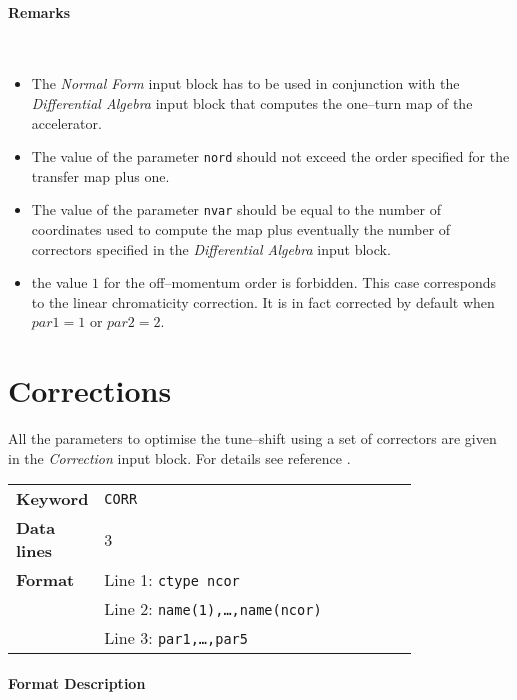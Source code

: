 \paragraph{Remarks}~
\begin{itemize}
    \item The \textit{Normal Form} input block has to be used in conjunction with the \textit{Differential Algebra} input block that computes the one--turn map of the accelerator.
    \item The value of the parameter \texttt{nord} should not exceed the order specified for the transfer map plus one.
    \item The value of the parameter \texttt{nvar} should be equal to the number of coordinates used to compute the map plus eventually the number of correctors specified in the \textit{Differential Algebra} input block.
    \item the value $1$ for the off--momentum order is forbidden. This case corresponds to the linear chromaticity correction. It is in fact corrected by default when $par1 =1$ or $par2 =2$.
\end{itemize}

\section{Corrections} \label{Corrections}

All the parameters to optimise the tune--shift using a set of correctors are given in the \textit{Correction} input block.
For details see reference \cite{Massimo}.

\bigskip
\begin{tabular}{@{}lp{0.8\linewidth}}
    \textbf{Keyword}    & \texttt{CORR} \\
    \textbf{Data lines} & 3 \\
    \textbf{Format}     & Line 1: \texttt{ctype ncor} \\
                        & Line 2: \texttt{name(1),\ldots,name(ncor)} \\
                        & Line 3: \texttt{par1,\ldots,par5}
\end{tabular}

\paragraph{Format Description}~

